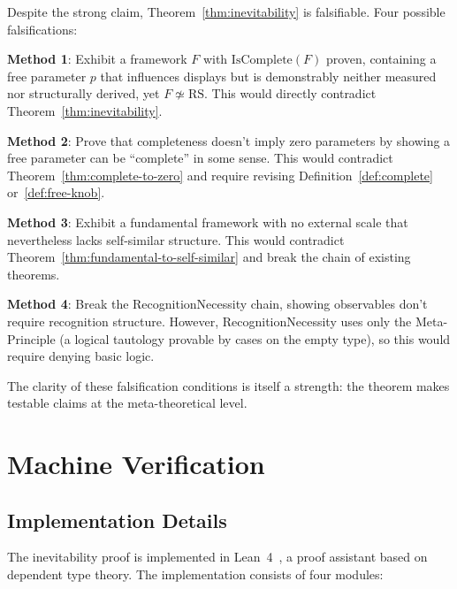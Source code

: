 \documentclass[12pt]{article}
\theoremstyle{remark}
\begin{document}
Despite the strong claim, Theorem~\ref{thm:inevitability} is falsifiable. Four possible falsifications:

\textbf{Method 1}: Exhibit a framework $F$ with $\mathrm{IsComplete}(F)$ proven, containing a free parameter $p$ that influences displays but is demonstrably neither measured nor structurally derived, yet $F \not\simeq \mathrm{RS}$. This would directly contradict Theorem~\ref{thm:inevitability}.

\textbf{Method 2}: Prove that completeness doesn't imply zero parameters by showing a free parameter can be ``complete'' in some sense. This would contradict Theorem~\ref{thm:complete-to-zero} and require revising Definition~\ref{def:complete} or~\ref{def:free-knob}.

\textbf{Method 3}: Exhibit a fundamental framework with no external scale that nevertheless lacks self-similar structure. This would contradict Theorem~\ref{thm:fundamental-to-self-similar} and break the chain of existing theorems.

\textbf{Method 4}: Break the RecognitionNecessity chain, showing observables don't require recognition structure. However, RecognitionNecessity uses only the Meta-Principle (a logical tautology provable by cases on the empty type), so this would require denying basic logic.

The clarity of these falsification conditions is itself a strength: the theorem makes testable claims at the meta-theoretical level.

\section{Machine Verification}

\subsection{Implementation Details}

The inevitability proof is implemented in Lean~4~\cite{Lean2024}, a proof assistant based on dependent type theory. The implementation consists of four modules:
\end{document}
